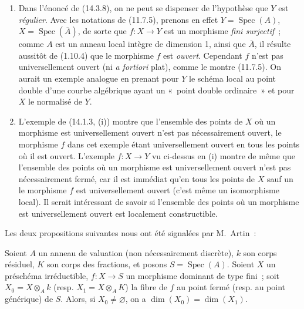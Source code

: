 \begin{remarks}[14.3.9]
\label{IV.14.3.9-fr}
\begin{enumerate}[label=(\roman*)]
  \item Dans l'énoncé de (14.3.8), on ne peut se dispenser de l'hypothèse que $Y$
  est \emph{régulier}. Avec les notations de (11.7.5), prenons en effet
  $Y=\operatorname{Spec}(A)$, $X=\operatorname{Spec}(\overline A)$, de sorte que
  $f:X\to Y$ est un morphisme \emph{fini surjectif}~; comme $A$ est un anneau
  local intègre de dimension 1, ainsi que $\overline A$, il résulte aussitôt de
  (1.10.4) que le morphisme $f$ est \emph{ouvert}. Cependant $f$ n'est pas
  universellement ouvert (ni \emph{a fortiori} plat), comme le montre (11.7.5).
  On aurait un exemple analogue en prenant pour $Y$ le schéma local au point
  double d'une courbe algébrique ayant un «~point double ordinaire~» et pour $X$
  le normalisé de $Y$.

  \item L'exemple de (14.1.3, (i)) montre que l'ensemble des points de $X$ où un
  morphisme est universellement ouvert n'est pas nécessairement ouvert, le
  morphisme $f$ dans cet exemple étant universellement ouvert en tous les points
  où il est ouvert. L'exemple $f:X\to Y$ vu ci-dessus en (i) montre de même que
  l'ensemble des points où un morphisme est universellement ouvert n'est pas
  nécessairement fermé, car il est immédiat qu'en tous les points de $X$ sauf un
  le morphisme $f$ est universellement ouvert (c'est même un isomorphisme local).
  Il serait intéressant de savoir si l'ensemble des points où un morphisme est
  universellement ouvert est localement constructible.
\end{enumerate}
\end{remarks}

Les deux propositions suivantes nous ont été signalées par M.~Artin~:

\begin{lemma}[14.3.10]
\label{IV.14.3.10-fr}
Soient $A$ un anneau de valuation (non nécessairement discrète), $k$ son corps
résiduel, $K$ son corps des fractions, et posons $S=\operatorname{Spec}(A)$. Soient
$X$ un préschéma irréductible, $f:X\to S$ un morphisme dominant de type fini~; soit
$X_0=X\otimes_A k$ (resp. $X_1=X\otimes_A K$) la fibre de $f$ au point fermé
(resp. au point générique) de $S$. Alors, si $X_0\ne\varnothing$, on a
$\dim(X_0)=\dim(X_1)$.
\end{lemma}

